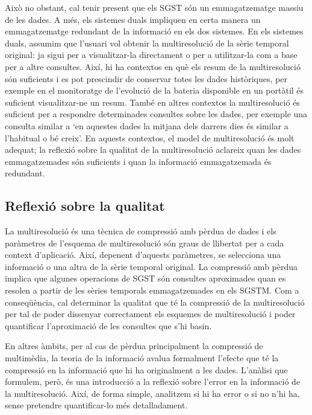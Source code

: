 Això no obstant, cal tenir present que els \gls{SGST} són un
emmagatzematge massiu de les dades. A més, els sistemes duals
impliquen en certa manera un emmagatzematge redundant de la informació
en els dos sistemes.  En els sistemes duals, assumim que l'usuari vol
obtenir la multiresolució de la sèrie temporal original: ja sigui per
a visualitzar-la directament o per a utilitzar-la com a base per a
altre consultes.  Així, hi ha contextos en què els resum de la
multiresolució són suficients i es pot prescindir de conservar totes
les dades històriques, per exemple en el monitoratge de l'evolució de
la bateria disponible en un portàtil és suficient visualitzar-ne un
resum. També en altres contextos la multiresolució és suficient per a
respondre determinades consultes sobre les dades, per exemple una
consulta similar a `en aquestes dades la mitjana dels darrers dies és
similar a l'habitual o bé creix'. En aquests contextos, el model de
multiresolució és molt adequat; la reflexió sobre la qualitat de la
multiresolució aclareix quan les dades emmagatzemades són
suficients i quan la informació emmagatzemada és redundant.






\subsection{Reflexió sobre la qualitat}


La multiresolució és una tècnica de compressió amb pèrdua de dades i
els paràmetres de l'esquema de multiresolució són graus de llibertat
per a cada context d'aplicació. Així, depenent d'aquests paràmetres,
se selecciona una informació o una altra de la sèrie temporal
original.  La compressió amb pèrdua implica que algunes operacions de
\gls{SGST} són consultes aproximades quan es resolen a partir de les
sèries temporals emmagatzemades en els \gls{SGSTM}. Com a
conseqüència, cal determinar la qualitat que té la compressió de la
multiresolució per tal de poder dissenyar correctament els esquemes de
multiresolució i poder quantificar l'aproximació de les consultes que
s'hi basin.


En altres àmbits, per al cas de pèrdua principalment la compressió de
multimèdia, la teoria de la informació avalua formalment l'efecte que
té la compressió en la informació que hi ha originalment a les dades.
L'anàlisi que formulem, però, és una introducció a la reflexió sobre
l'error en la informació de la multiresolució. Així, de forma simple,
analitzem si hi ha error o si no n'hi ha, sense pretendre
quantificar-lo més detalladament. 



